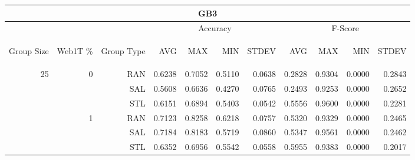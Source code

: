 \begin{center}
\begin{table}[htbp]
\begin{tabular}{ | r | r | r | r | r | r | r | r | r | r | r |}
\hline
\multicolumn{11}{|c|}{GB3}\\
\hline
 & & & \multicolumn{4}{|c|}{Accuracy} & \multicolumn{4}{|c|}{F-Score}\\ \cline{4-11}
\begin{sideways}Group Size\end{sideways} & \begin{sideways}Web1T \%\end{sideways} & \begin{sideways}Group Type\end{sideways} & \begin{sideways}AVG\end{sideways} & \begin{sideways}MAX\end{sideways} & \begin{sideways}MIN\end{sideways} & \begin{sideways}STDEV\end{sideways} & \begin{sideways}AVG\end{sideways} & \begin{sideways}MAX\end{sideways} & \begin{sideways}MIN\end{sideways} & \begin{sideways}STDEV\end{sideways}\\
\hline
\multirow{18}{*}{25}
 & \multirow{3}{*}{0} & RAN & 0.6238 & 0.7052 & 0.5110 & 0.0638 & 0.2828 & 0.9304 & 0.0000 & 0.2843\\ \cline{3-11}
 &   & SAL & 0.5608 & 0.6636 & 0.4270 & 0.0765 & 0.2493 & 0.9253 & 0.0000 & 0.2652\\ \cline{3-11}
 &   & STL & 0.6151 & 0.6894 & 0.5403 & 0.0542 & 0.5556 & 0.9600 & 0.0000 & 0.2281\\ \cline{2-11}
 & \multirow{3}{*}{1} & RAN & 0.7123 & 0.8258 & 0.6218 & 0.0757 & 0.5320 & 0.9329 & 0.0000 & 0.2465\\ \cline{3-11}
 &   & SAL & 0.7184 & 0.8183 & 0.5719 & 0.0860 & 0.5347 & 0.9561 & 0.0000 & 0.2462\\ \cline{3-11}
 &   & STL & 0.6352 & 0.6956 & 0.5542 & 0.0558 & 0.5955 & 0.9383 & 0.0000 & 0.2017\\ \cline{2-11}

\end{tabular}
\end{table}
\end{center}
